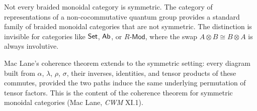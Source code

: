 \documentclass[../preamble]{subfiles}
\begin{document}
\begin{remark}
  \label{rem:symmetric-vs-braided}
  Not every braided monoidal category is symmetric.
  The category of representations of a non-cocommutative quantum group
  provides a standard family of braided monoidal categories
  that are not symmetric.
  The distinction is invisible for categories like $\mathsf{Set}$, $\mathsf{Ab}$,
  or $R$-$\mathsf{Mod}$,
  where the swap $A \otimes B \cong B \otimes A$
  is always involutive.
\end{remark}

\begin{remark}
  \label{rem:symmetric-coherence}
  Mac Lane's coherence theorem extends to the symmetric setting:
  every diagram built from
  $\alpha$, $\lambda$, $\rho$, $\sigma$,
  their inverses,
  identities,
  and tensor products of these
  commutes,
  provided the two paths induce the same underlying permutation of tensor factors.
  This is the content of the coherence theorem for symmetric monoidal categories
  (Mac Lane, \emph{CWM} XI.1).
\end{remark}
\end{document}
